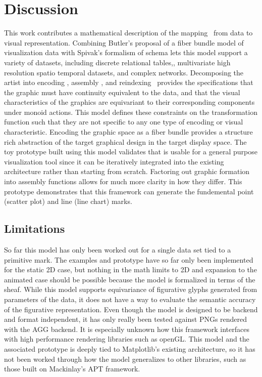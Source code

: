 \documentclass[journal]{vgtc}                %
\begin{document}
\section{Discussion}
This work contributes a mathematical description of the mapping \vartist\ from data to visual representation. Combining Butler's proposal of a fiber bundle model of visualization data with Spivak's formalism of schema lets this model support a variety of datasets, including  discrete relational tables,, multivariate high resolution spatio temporal datasets, and complex networks. Decomposing the artist into encoding \vchannel, assembly \vmark, and reindexing \vindex\ provides the specifications that the graphic must have continuity equivalent to the data, and that the visual characteristics of the graphics are equivariant to their corresponding components under monoid actions. This model defines these constraints on the transformation function such that they are not specific to any one type of encoding or visual characteristic. Encoding the graphic space as a fiber bundle provides a structure rich abstraction of the target graphical design in the target display space. The toy prototype built using this model validates that is usable for a general purpose visualization tool since it can be iteratively integrated into the existing architecture rather than starting from scratch. Factoring out graphic formation into assembly functions allows for much more clarity in how they differ. This prototype demonstrates that this framework can generate the fundemental point (scatter plot) and line (line chart) marks. 

\subsection{Limitations}
So far this model has only been worked out for a single data set tied to a primitive mark. The examples and prototype have so far only been implemented for the static 2D case, but nothing in the math limits to 2D and expansion to the animated case should be possible because the model is formalized in terms of the sheaf. While this model supports equivariance of figurative glyphs generated from parameters of the data\cite{beckfeathers2014,byrneFigurativeFramesCritical2017}, it does not have a way to evaluate the semantic accuracy of the figurative representation. Even though the model is designed to be backend and format independent, it has only really been tested against PNGs rendered with the AGG backend. It is especially unknown how this framework interfaces with high performance rendering libraries such as openGL\cite{CarsonOpenGL1997}. This model and the associated prototype is deeply tied to Matplotlib's existing architecture, so it has not been worked through how the model generalizes to other libraries, such as those built on Mackinlay's APT framework.
\end{document}
